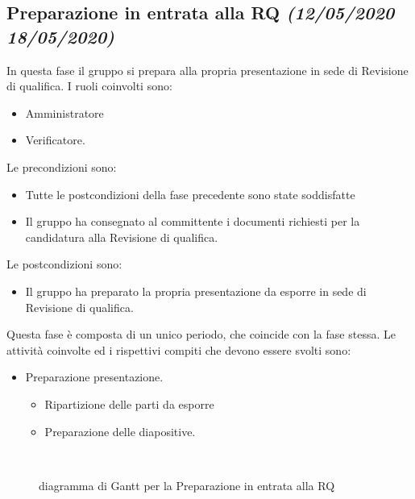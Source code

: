 \documentclass[../piano-di-progetto.tex]{subfiles}
\begin{document}
\subsection[Preparazione in entrata alla RQ]{Preparazione in entrata alla RQ {\normalsize\normalfont\itshape(12/05/2020  18/05/2020)}}%
\label{sub:preparazione_in_entrata_alla_rq}
In questa fase il gruppo si prepara alla propria presentazione in sede di Revisione di qualifica.
I ruoli coinvolti sono:
\begin{itemize}
  \item Amministratore
  \item Verificatore.
\end{itemize}
Le precondizioni sono:
\begin{itemize}
  \item Tutte le postcondizioni della fase precedente sono state soddisfatte
  \item Il gruppo ha consegnato al committente i documenti richiesti per la candidatura alla Revisione di qualifica.
\end{itemize}
Le postcondizioni sono:
\begin{itemize}
  \item Il gruppo ha preparato la propria presentazione da esporre in sede di Revisione di qualifica.
\end{itemize}
Questa fase è composta di un unico periodo, che coincide con la fase stessa.
Le attività coinvolte ed i rispettivi compiti che devono essere svolti sono:
\begin{itemize}
  \item Preparazione presentazione.
  \begin{itemize}
    \item Ripartizione delle parti da esporre
    \item Preparazione delle diapositive.
  \end{itemize}
\end{itemize}
\begin{figure}[H]
  \centering
  
  \caption{diagramma di Gantt per la Preparazione in entrata alla RQ}%
~~\label{fig:gantt_preparazione_ra}
\end{figure}
\end{document}
